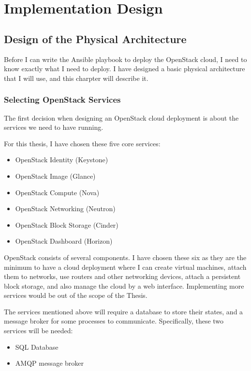 \chapter{Implementation Design}
\label{ch:implementation}



\section{Design of the Physical Architecture}
\label{sec:phys}

Before I can write the Ansible playbook to deploy the OpenStack cloud, I need to know exactly what I need to deploy. I have designed a basic physical architecture that I will use, and this charpter will describe it.

\subsection{Selecting OpenStack Services}
The first decision when designing an OpenStack cloud deployment is about the services we need to have running.

For this thesis, I have chosen these five core services:
\begin{itemize}
  \item{OpenStack Identity (Keystone)}
  \item{OpenStack Image (Glance)}
  \item{OpenStack Compute (Nova)}
  \item{OpenStack Networking (Neutron)}
  \item{OpenStack Block Storage (Cinder)}
  \item{OpenStack Dashboard (Horizon)}
\end{itemize}

OpenStack consists of several components. I have chosen these six as they are the minimum to have a cloud deployment where I can create virtual machines, attach them to networks, use routers and other networking devices, attach a persistent block storage, and also manage the cloud by a web interface. Implementing more services would be out of the scope of the Thesis.


The services mentioned above will require a database to store their states, and a message broker for some processes to communicate. Specifically, these two services will be needed:
\begin{itemize}
  \item{SQL Database}
  \item{AMQP message broker}
\end{itemize}



